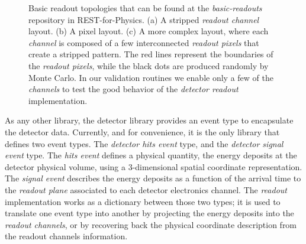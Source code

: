 \begin{figure}[htb!]
  \centering
	\caption{Basic readout topologies that can be found at the \emph{basic-readouts} repository in REST-for-Physics. (a) A stripped \emph{readout channel} layout. (b) A pixel layout. (c) A more complex layout, where each \emph{channel} is composed of a few interconnected \emph{readout pixels} that create a stripped pattern. The red lines represent the boundaries of the \emph{readout pixels}, while the black dots are produced randomly by Monte Carlo. In our validation routines we enable only a few of the \emph{channels} to test the good behavior of the \emph{detector readout} implementation.}\label{fig:readouts}
\end{figure}

As any other library, the detector library provides an event type to encapsulate the detector data. Currently, and for convenience, it is the only library that defines two event types. The \emph{detector hits event} type, and the \emph{detector signal event} type. The \emph{hits event} defines a physical quantity, the energy deposits at the detector physical volume, using a 3-dimensional spatial coordinate representation. The \emph{signal event} describes the energy deposits as a function of the arrival time to the \emph{readout plane} associated to each detector electronics channel. The \emph{readout} implementation works as a dictionary between those two types; it is used to translate one event type into another by projecting the energy deposits into the \emph{readout channels}, or by recovering back the physical coordinate description from the readout channels information.

